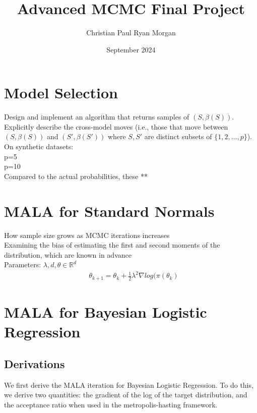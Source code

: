 \documentclass{article}
\title{Advanced MCMC Final Project}
\author{Christian Paul Ryan Morgan }
\date{September 2024}
\begin{document}
\maketitle

\section{Model Selection} 
Design and implement an algorithm that returns samples of $(S, \beta(S))$. Explicitly describe the cross-model moves (i.e., those that move between $(S, \beta(S))$ and $(S', \beta(S'))$ where $S, S'$ are distinct subsets of $\{1, 2, \dots, p\}$). \\ 

On synthetic datasets: \\
p=5 \\ 
p=10 \\
Compared to the actual probabilities, these ** \\ 


\section{MALA for Standard Normals}

How sample size grows as MCMC iterations increases \\
Examining the bias of estimating the first and second moments of the distribution, which are known in advance \\ 



Parameters: $\lambda, d, \theta \in\mathbb{R}^{d}$
\begin{align}
    & \theta_{k+1} = \theta_{k} + \frac{1}{2}\lambda^{2} \nabla log(\pi(\theta_{k}) 
\end{align}

\section{MALA for Bayesian Logistic Regression}

\subsection{Derivations}

We first derive the MALA iteration for Bayesian Logistic Regression. 
To do this, we derive two quantities: the gradient of the log of the target distribution, 
and the acceptance ratio when used in the metropolis-hasting framework.
\end{document}
